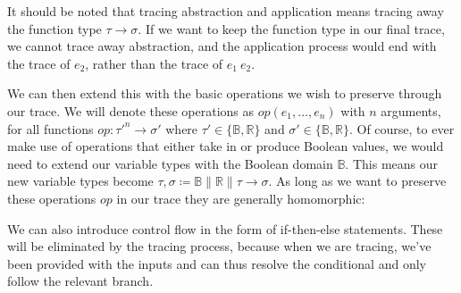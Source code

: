         \begin{prooftree}
        \end{prooftree}

        It should be noted that tracing abstraction and application means tracing away the function type $\tau\to\sigma$.
        If we want to keep the function type in our final trace, we cannot trace away abstraction, and the application process would end with the trace of $e_2$, rather than the trace of $e_1\ e_2$.

        We can then extend this with the basic operations we wish to preserve through our trace.
        We will denote these operations as $op(e_1,\dots,e_n)$ with $n$ arguments, for all functions $op:\tau'^n\to\sigma'$ where $\tau'\in\{\mathbb{B},\mathbb{R}\}$ and $\sigma'\in\{\mathbb{B},\mathbb{R}\}$.
        Of course, to ever make use of operations that either take in or produce Boolean values, we would need to extend our variable types with the Boolean domain $\mathbb{B}$.
        This means our new variable types become $\tau,\sigma\coloneqq\mathbb{B}\|\mathbb{R}\|\tau\to\sigma$.
        As long as we want to preserve these operations $op$ in our trace they are generally homomorphic:

        \begin{prooftree}
        \end{prooftree}

        \begin{prooftree}
        \end{prooftree}

        We can also introduce control flow in the form of if-then-else statements.
        These will be eliminated by the tracing process, because when we are tracing, we've been provided with the inputs and can thus resolve the conditional and only follow the relevant branch.
        
